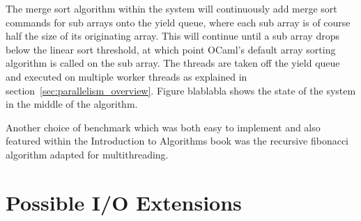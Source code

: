 \documentclass[12pt,twoside,notitlepage]{report}
\begin{document}
The merge sort algorithm within the system will continuously add merge sort commands for sub arrays onto the yield queue, where each sub array is of course half the size of its originating array. This will continue until a sub array
drops below the linear sort threshold, at which point OCaml's default array sorting algorithm is called on the sub array. The threads are taken off the yield queue and executed on multiple worker threads as explained in
section~\ref{sec:parallelism_overview}. Figure blablabla shows the state of the system in the middle of the algorithm.

%
%
Another choice of benchmark which was both easy to implement and also featured within the Introduction to Algorithms book was the recursive fibonacci algorithm adapted for multithreading.

%
%

\section{Possible I/O Extensions}
\label{sec:possible_io_extensions}
%
%

%
%

%
%

%
%

%
%
\end{document}
